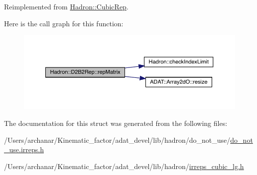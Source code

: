 Reimplemented from \mbox{\hyperlink{structHadron_1_1CubicRep_ac5d7e9e6f4ab1158b5fce3e4ad9e8005}{Hadron\+::\+Cubic\+Rep}}.

Here is the call graph for this function\+:
\nopagebreak
\begin{figure}[H]
\begin{center}
\leavevmode
\includegraphics[width=350pt]{d3/dbb/structHadron_1_1D2B2Rep_a0e46bb79c1d9429a207f9f82eef59450_cgraph}
\end{center}
\end{figure}


The documentation for this struct was generated from the following files\+:\begin{DoxyCompactItemize}
\item 
/\+Users/archanar/\+Kinematic\+\_\+factor/adat\+\_\+devel/lib/hadron/do\+\_\+not\+\_\+use/\mbox{\hyperlink{do__not__use_8irreps_8h}{do\+\_\+not\+\_\+use.\+irreps.\+h}}\item 
/\+Users/archanar/\+Kinematic\+\_\+factor/adat\+\_\+devel/lib/hadron/\mbox{\hyperlink{lib_2hadron_2irreps__cubic__lg_8h}{irreps\+\_\+cubic\+\_\+lg.\+h}}\end{DoxyCompactItemize}
